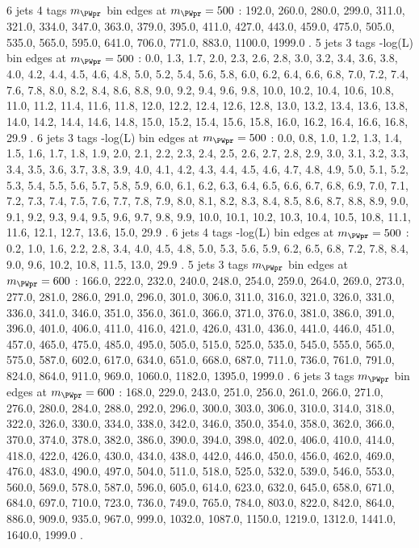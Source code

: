 6 jets 4 \Pqb tags $m_{\PWpr}$ bin edges at $m_{\PWpr}=500$ \GeV:
192.0, 260.0, 280.0, 299.0, 311.0, 321.0, 334.0, 347.0, 363.0, 379.0, 395.0, 411.0, 427.0, 443.0, 459.0, 475.0, 505.0, 535.0, 565.0, 595.0, 641.0, 706.0, 771.0, 883.0, 1100.0, 1999.0 .
5 jets 3 \Pqb tags -log(L) bin edges at $m_{\PWpr}=500$ \GeV:
0.0, 1.3, 1.7, 2.0, 2.3, 2.6, 2.8, 3.0, 3.2, 3.4, 3.6, 3.8, 4.0, 4.2, 4.4, 4.5, 4.6, 4.8, 5.0, 5.2, 5.4, 5.6, 5.8, 6.0, 6.2, 6.4, 6.6, 6.8, 7.0, 7.2, 7.4, 7.6, 7.8, 8.0, 8.2, 8.4, 8.6, 8.8, 9.0, 9.2, 9.4, 9.6, 9.8, 10.0, 10.2, 10.4, 10.6, 10.8, 11.0, 11.2, 11.4, 11.6, 11.8, 12.0, 12.2, 12.4, 12.6, 12.8, 13.0, 13.2, 13.4, 13.6, 13.8, 14.0, 14.2, 14.4, 14.6, 14.8, 15.0, 15.2, 15.4, 15.6, 15.8, 16.0, 16.2, 16.4, 16.6, 16.8, 29.9 .
6 jets 3 \Pqb tags -log(L) bin edges at $m_{\PWpr}=500$ \GeV:
0.0, 0.8, 1.0, 1.2, 1.3, 1.4, 1.5, 1.6, 1.7, 1.8, 1.9, 2.0, 2.1, 2.2, 2.3, 2.4, 2.5, 2.6, 2.7, 2.8, 2.9, 3.0, 3.1, 3.2, 3.3, 3.4, 3.5, 3.6, 3.7, 3.8, 3.9, 4.0, 4.1, 4.2, 4.3, 4.4, 4.5, 4.6, 4.7, 4.8, 4.9, 5.0, 5.1, 5.2, 5.3, 5.4, 5.5, 5.6, 5.7, 5.8, 5.9, 6.0, 6.1, 6.2, 6.3, 6.4, 6.5, 6.6, 6.7, 6.8, 6.9, 7.0, 7.1, 7.2, 7.3, 7.4, 7.5, 7.6, 7.7, 7.8, 7.9, 8.0, 8.1, 8.2, 8.3, 8.4, 8.5, 8.6, 8.7, 8.8, 8.9, 9.0, 9.1, 9.2, 9.3, 9.4, 9.5, 9.6, 9.7, 9.8, 9.9, 10.0, 10.1, 10.2, 10.3, 10.4, 10.5, 10.8, 11.1, 11.6, 12.1, 12.7, 13.6, 15.0, 29.9 .
6 jets 4 \Pqb tags -log(L) bin edges at $m_{\PWpr}=500$ \GeV:
0.2, 1.0, 1.6, 2.2, 2.8, 3.4, 4.0, 4.5, 4.8, 5.0, 5.3, 5.6, 5.9, 6.2, 6.5, 6.8, 7.2, 7.8, 8.4, 9.0, 9.6, 10.2, 10.8, 11.5, 13.0, 29.9 .
5 jets 3 \Pqb tags $m_{\PWpr}$ bin edges at $m_{\PWpr}=600$ \GeV:
166.0, 222.0, 232.0, 240.0, 248.0, 254.0, 259.0, 264.0, 269.0, 273.0, 277.0, 281.0, 286.0, 291.0, 296.0, 301.0, 306.0, 311.0, 316.0, 321.0, 326.0, 331.0, 336.0, 341.0, 346.0, 351.0, 356.0, 361.0, 366.0, 371.0, 376.0, 381.0, 386.0, 391.0, 396.0, 401.0, 406.0, 411.0, 416.0, 421.0, 426.0, 431.0, 436.0, 441.0, 446.0, 451.0, 457.0, 465.0, 475.0, 485.0, 495.0, 505.0, 515.0, 525.0, 535.0, 545.0, 555.0, 565.0, 575.0, 587.0, 602.0, 617.0, 634.0, 651.0, 668.0, 687.0, 711.0, 736.0, 761.0, 791.0, 824.0, 864.0, 911.0, 969.0, 1060.0, 1182.0, 1395.0, 1999.0 .
6 jets 3 \Pqb tags $m_{\PWpr}$ bin edges at $m_{\PWpr}=600$ \GeV:
168.0, 229.0, 243.0, 251.0, 256.0, 261.0, 266.0, 271.0, 276.0, 280.0, 284.0, 288.0, 292.0, 296.0, 300.0, 303.0, 306.0, 310.0, 314.0, 318.0, 322.0, 326.0, 330.0, 334.0, 338.0, 342.0, 346.0, 350.0, 354.0, 358.0, 362.0, 366.0, 370.0, 374.0, 378.0, 382.0, 386.0, 390.0, 394.0, 398.0, 402.0, 406.0, 410.0, 414.0, 418.0, 422.0, 426.0, 430.0, 434.0, 438.0, 442.0, 446.0, 450.0, 456.0, 462.0, 469.0, 476.0, 483.0, 490.0, 497.0, 504.0, 511.0, 518.0, 525.0, 532.0, 539.0, 546.0, 553.0, 560.0, 569.0, 578.0, 587.0, 596.0, 605.0, 614.0, 623.0, 632.0, 645.0, 658.0, 671.0, 684.0, 697.0, 710.0, 723.0, 736.0, 749.0, 765.0, 784.0, 803.0, 822.0, 842.0, 864.0, 886.0, 909.0, 935.0, 967.0, 999.0, 1032.0, 1087.0, 1150.0, 1219.0, 1312.0, 1441.0, 1640.0, 1999.0 .
